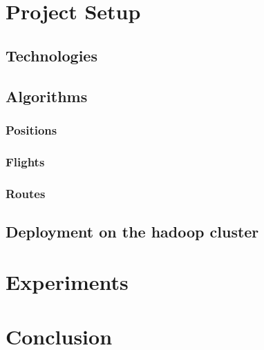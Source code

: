 \documentclass{vldb}
\begin{document}
\section{Project Setup}

\subsection{Technologies}

\subsection{Algorithms}

\subsubsection{Positions}

\subsubsection{Flights}

\subsubsection{Routes}

\subsection{Deployment on the hadoop cluster}

\section{Experiments}

\section{Conclusion}
\end{document}
